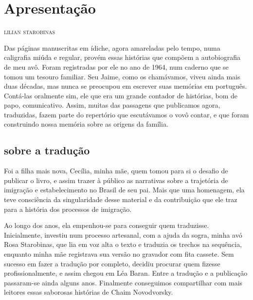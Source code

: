 \newcommand{\subtitulo}[1]{\NoCaseChange{\textnormal{\break\Large\itshape#1}}}
\chapter*{Apresentação\smallskip\subtitulo{Um road movie em forma\\de narrativa}}


\begin{flushright}
\textsc{lilian starobinas}
\end{flushright}\medskip

\noindent{}Das páginas manuscritas em ídiche, agora amareladas pelo tempo, numa
caligrafia miúda e regular, provém essas histórias que compõem a
autobiografia de meu avô. Foram registradas por ele no ano de 1964, num
caderno que se tomou um tesouro familiar. Seu Jaime, como os chamávamos,
viveu ainda mais duas décadas, mas nunca se preocupou em escrever suas
memórias em português. Contá-las oralmente sim, ele que era um grande
contador de histórias, bom de papo, comunicativo. Assim, muitas das
passagens que publicamos agora, traduzidas, fazem parte do repertório que
escutávamos o vovô contar, e que foram construindo nossa memória sobre
as origens da família.

\section{sobre a tradução}

Foi a filha mais nova, Cecília, minha mãe, quem tomou para si o desafio
de publicar o livro, e assim trazer à público as narrativas sobre a
trajetória de imigração e estabelecimento no Brasil de seu pai. Mais que
uma homenagem, ela teve consciência da singularidade desse material e da
contribuição que ele traz para a história dos processos de imigração.

Ao longo dos anos, ela empenhou-se para conseguir quem traduzisse.
Inicialmente, investiu num processo artesanal, com a ajuda da sogra,
minha avó Rosa Starobinas, que lia em voz alta o texto e traduzia os
trechos na sequência, enquanto minha mãe registrava sua versão no
gravador com fita cassete. Sem sucesso em fazer a tradução por completo,
decidiu procurar quem fizesse profissionalmente, e assim chegou em Léa
Baran. Entre a tradução e a publicação passaram-se ainda alguns anos.
Finalmente conseguimos compartilhar com mais leitores essas saborosas
histórias de Chaim Novodvorsky.

